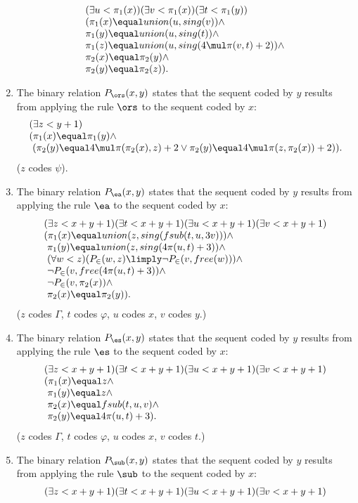 \begin{enumerate}[1.]
\[
\begin{array}{l}
(\exists u < \pi_1(x))(\exists v < \pi_1(x))(\exists t < \pi_1(y)) \cr
(\pi_1(x) \equal union(u, sing(v)) \land \cr
\pi_1(y) \equal union(u, sing(t)) \land \cr
\pi_1(z) \equal union(u, sing(4 \mul \pi(v, t) + 2)) \land \cr
\pi_2(x) \equal \pi_2(y) \land \cr
\pi_2(y) \equal \pi_2(z)).
\end{array}
\]
%
\item The binary relation $P_\ors(x, y)$ states that the sequent coded by $y$ results from applying the rule $\ors$ to the sequent coded by $x$:
\[
\begin{array}{l}
(\exists z < y + 1) \cr
(\pi_1(x) \equal \pi_1(y) \land \cr
\ (\pi_2(y) \equal 4 \mul \pi(\pi_2(x), z) + 2 \lor \pi_2(y) \equal 4 \mul \pi(z, \pi_2(x)) + 2)).
\end{array}
\]
($z$ codes $\psi$).
%
\item The binary relation $P_\ea(x, y)$ states that the sequent coded by $y$ results from applying the rule $\ea$ to the sequent coded by $x$:
\[
\begin{array}{l}
(\exists z < x + y + 1)(\exists t < x + y + 1)(\exists u < x + y + 1)(\exists v < x + y + 1) \cr
(\pi_1(x) \equal union(z, sing(fsub(t, u, 3v))) \land \cr
\ \pi_1(y) \equal union(z, sing(4\pi(u, t) + 3)) \land \cr
\ (\forall w < z)(P_\in(w, z) \limply \neg P_\in(v, free(w))) \land \cr
\ \neg P_\in(v, free(4\pi(u, t) + 3)) \land \cr
\ \neg P_\in(v, \pi_2(x)) \land \cr
\ \pi_2(x) \equal \pi_2(y)).
\end{array}
\]
($z$ codes $\Gamma$, $t$ codes $\varphi$, $u$ codes $x$, $v$ codes $y$.)
%
\item The binary relation $P_\es(x, y)$ states that the sequent coded by $y$ results from applying the rule $\es$ to the sequent coded by $x$:
\[
\begin{array}{l}
(\exists z < x + y + 1)(\exists t < x + y + 1)(\exists u < x + y + 1)(\exists v < x + y + 1) \cr
(\pi_1(x) \equal z \land \cr
\ \pi_1(y) \equal z \land \cr
\ \pi_2(x) \equal fsub(t, u, v) \land \cr
\ \pi_2(y) \equal 4\pi(u, t) + 3).
\end{array}
\]
($z$ codes $\Gamma$, $t$ codes $\varphi$, $u$ codes $x$, $v$ codes $t$.)
%
\item The binary relation $P_\sub(x, y)$ states that the sequent coded by $y$ results from applying the rule $\sub$ to the sequent coded by $x$:
\[
\begin{array}{l}
(\exists z < x + y + 1)(\exists t < x + y + 1)(\exists u < x + y + 1)(\exists v < x + y + 1) \cr

\end{array}\]
\end{enumerate}
